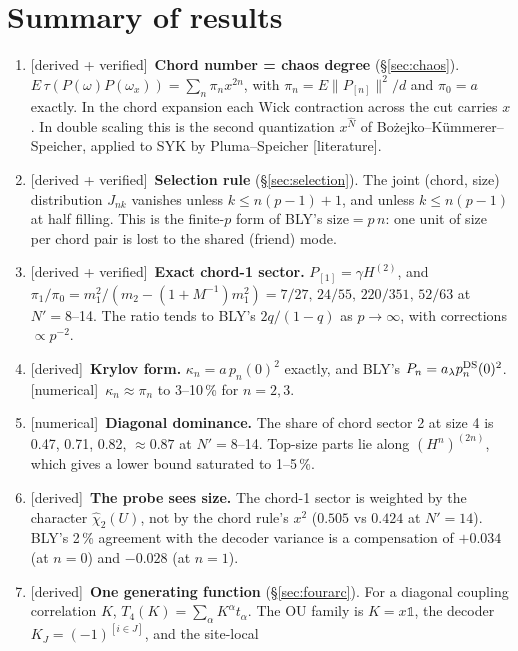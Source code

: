 \documentclass[11pt]{article}
\newcommand{\Np}{N'}
\newcommand{\one}{\mathds 1}
\newcommand{\tagbox}[2]{\textsf{\small\color{#1}[#2]}}
\newcommand{\EST}{\tagbox{cest}{literature}}
\newcommand{\DER}{\tagbox{cder}{derived}}
\newcommand{\VER}{\tagbox{cder}{derived + verified}}
\newcommand{\NUM}{\tagbox{cnum}{numerical}}
\theoremstyle{remark}
\begin{document}
\tableofcontents

\section{Summary of results}
\begin{enumerate}\itemsep3pt
\item \VER\ \textbf{Chord number = chaos degree} (\S\ref{sec:chaos}).
  $E\,\tau(P(\omega)P(\omega_x))=\sum_n\pi_nx^{2n}$, with $\pi_n=E\|P_{[n]}\|^2/d$ and $\pi_0=a$ exactly. In the chord
  expansion each Wick contraction across the cut carries $x$. In double scaling this is the second quantization
  $x^{\hat N}$ of Bożejko--Kümmerer--Speicher, applied to SYK by Pluma--Speicher \EST.
\item \VER\ \textbf{Selection rule} (\S\ref{sec:selection}). The joint (chord, size) distribution $J_{nk}$ vanishes
  unless $k\le n(p-1)+1$, and unless $k\le n(p-1)$ at half filling. This is the finite-$p$ form of BLY's
  $\mathrm{size}=p\,n$: one unit of size per chord pair is lost to the shared (friend) mode.
\item \VER\ \textbf{Exact chord-1 sector.} $P_{[1]}=\gamma H^{(2)}$, and
  $\pi_1/\pi_0=m_1^2/(m_2-(1+M^{-1})m_1^2)=7/27,\,24/55,\,220/351,\,52/63$ at $\Np=8$--14. The ratio tends to BLY's
  $2q/(1-q)$ as $p\to\infty$, with corrections $\propto p^{-2}$.
\item \DER\ \textbf{Krylov form.} $\kappa_n=a\,p_n(0)^2$ exactly, and BLY's $P_n=a_\lambda p^{\rm DS}_n(0)^2$.
  \NUM\ $\kappa_n\approx\pi_n$ to 3--10\,\% for $n=2,3$.
\item \NUM\ \textbf{Diagonal dominance.} The share of chord sector 2 at size 4 is 0.47, 0.71, 0.82, $\approx0.87$ at
  $\Np=8$--14. Top-size parts lie along $(H^n)^{(2n)}$, which gives a lower bound saturated to 1--5\,\%.
\item \DER\ \textbf{The probe sees size.} The chord-1 sector is weighted by the character $\hat\chi_2(U)$, not by the
  chord rule's $x^2$ ($0.505$ vs $0.424$ at $\Np=14$). BLY's 2\,\% agreement with the decoder variance is a compensation
  of $+0.034$ (at $n=0$) and $-0.028$ (at $n=1$).
\item \DER\ \textbf{One generating function} (\S\ref{sec:fourarc}). For a diagonal coupling correlation $K$,
  $T_4(K)=\sum_\alpha K^\alpha t_\alpha$. The OU family is $K=x\one$, the decoder $K_J=(-1)^{[i\in J]}$, and the site-local

\end{enumerate}
\end{document}

